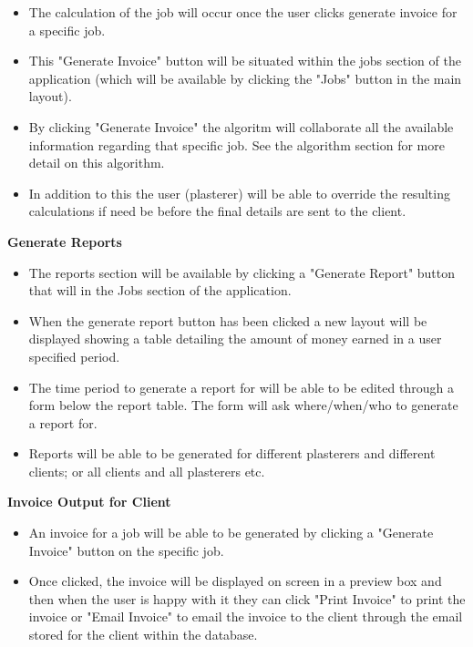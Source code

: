 	\begin{itemize}
		\item The calculation of the job will occur once the user clicks generate invoice for a specific job.
		\item This "Generate Invoice" button will be situated within the jobs section of the application (which will be available by clicking the "Jobs" button in the main layout).
		\item By clicking "Generate Invoice" the algoritm will collaborate all the available information regarding that specific job. See the algorithm section for more detail on this algorithm.
		\item In addition to this the user (plasterer) will be able to override the resulting calculations if need be before the final details are sent to the client.
	\end{itemize}

\textbf{Generate Reports}

	\begin{itemize}
		\item The reports section will be available by clicking a "Generate Report" button that will in the Jobs section of the application. 
		\item When the generate report button has been clicked a new layout will be displayed showing a table detailing the amount of money earned in a user specified period.
		\item The time period to generate a report for will be able to be edited through a form below the report table. The form will ask where/when/who to generate a report for.
		\item Reports will be able to be generated for different plasterers and different clients; or all clients and all plasterers etc.
	\end{itemize}

\textbf{Invoice Output for Client}

	\begin{itemize}
		\item An invoice for a job will be able to be generated by clicking a "Generate Invoice" button on the specific job. 
		\item Once clicked, the invoice will be displayed on screen in a preview box and then when the user is happy with it they can click "Print Invoice" to print the invoice or "Email Invoice" to email the invoice to the client through the email stored for the client within the database.
	\end{itemize}


